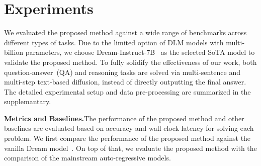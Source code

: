 \section{Experiments}\label{sec:res}
We evaluated the proposed method against a wide range of benchmarks across different types of tasks.
Due to the limited option of DLM models with multi-billion parameters, we choose Dream-Instruct-7B~\cite{dream2025} as the selected SoTA model to validate the proposed method. 
To fully solidify the effectiveness of our work, both question-answer~(QA) and reasoning tasks are solved via multi-sentence and multi-step text-based diffusion, instead of directly outputting the final answer. 
The detailed experimental setup and data pre-processing are summarized in the supplemantary. 

\textbf{Metrics and Baselines.}The performance of the proposed method and other baselines are evaluated based on accuracy and wall clock latency for solving each problem.
We first compare the performance of the proposed method against the vanilla Dream model~\cite{dream2025}. On top of that, we evaluate the proposed method with the comparison of the mainstream auto-regressive models. 


